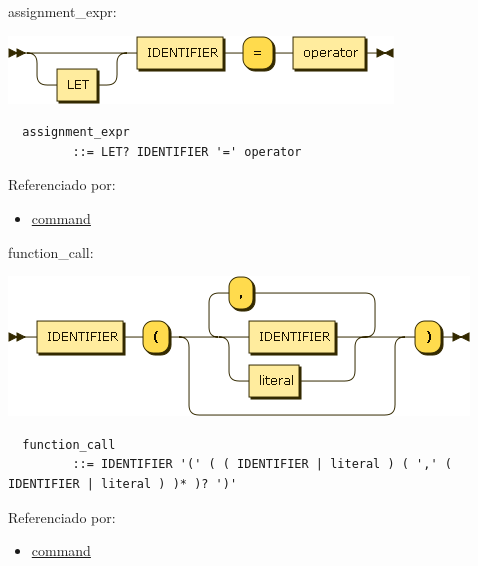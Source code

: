 \begin{minipage}{\textwidth}
  \protect\hypertarget{assignment_expr}{}{assignment\_expr:}

  \includegraphics[width=4.02083in,height=0.70833in]{diagram/assignment_expr.png}

  \begin{verbatim}
  assignment_expr
         ::= LET? IDENTIFIER '=' operator
  \end{verbatim}

  Referenciado por:

  \begin{itemize}
      \tightlist%
    \item
      \protect\hyperlink{command}{command}
  \end{itemize}

\end{minipage}

\begin{minipage}{\textwidth}
  \protect\hypertarget{function_call}{}{function\_call:}

  \includegraphics[width=4.81250in,height=1.45833in]{diagram/function_call.png}

  \begin{verbatim}
  function_call
         ::= IDENTIFIER '(' ( ( IDENTIFIER | literal ) ( ',' ( IDENTIFIER | literal ) )* )? ')'
  \end{verbatim}

  Referenciado por:

  \begin{itemize}
      \tightlist%
    \item
      \protect\hyperlink{command}{command}
  \end{itemize}

\end{minipage}

